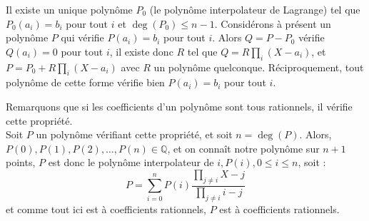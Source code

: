 \begin{sol}
Il existe un unique polynôme $P_0$ (le polynôme interpolateur de Lagrange) tel que $P_0(a_i)=b_i$ pour tout $i$ et $\deg(P_0)\leqslant n-1$. Considérons à présent un polynôme $P$ qui vérifie $P(a_i)=b_i$ pour tout $i$. Alors $Q=P-P_0$ vérifie $Q(a_i)=0$ pour tout $i$, il existe donc $R$ tel que $Q=R\prod\limits_i (X-a_i)$, et $P=P_0+R\prod\limits_i (X-a_i)$ avec $R$ un polynôme quelconque. Réciproquement, tout polynôme de cette forme vérifie bien $P(a_i)=b_i$ pour tout $i$.
\end{sol}
\begin{sol}
Remarquons que si les coefficients d'un polynôme sont tous rationnels, il vérifie cette propriété.\\
Soit $P$ un polynôme vérifiant cette propriété, et soit $n=\deg(P).$ Alors, $P(0),P(1),P(2),\ldots,P(n)\in\mathbb Q$, et on connaît notre polynôme sur $n+1$ points, $P$ est donc le polynôme interpolateur de $i,P(i),0\leqslant i\leqslant n$, soit : $$P=\sum_{i=0}^nP(i)\frac{\prod\limits_{j\ne i}X-j}{\prod\limits_{j\ne i}i-j}$$et comme tout ici est à coefficients rationnels, $P$ est à coefficients rationnels.
\end{sol}